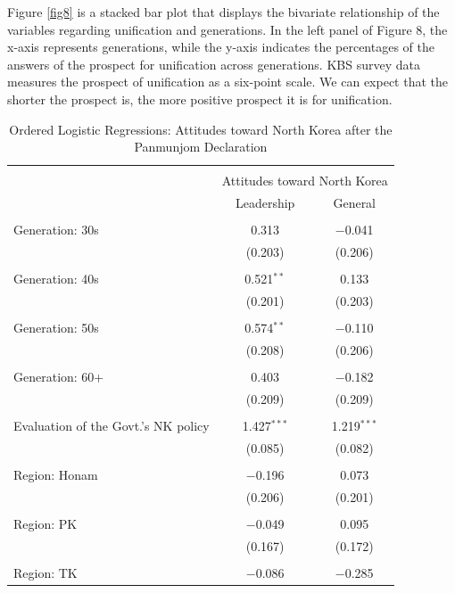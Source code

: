 \documentclass[letterpaper,9pt,twocolumn,twoside,]{pinp}
\begin{document}
Figure \ref{fig8} is a stacked bar plot that displays the bivariate
relationship of the variables regarding unification and generations. In
the left panel of Figure 8, the x-axis represents generations, while the
y-axis indicates the percentages of the answers of the prospect for
unification across generations. KBS survey data measures the prospect of
unification as a six-point scale. We can expect that the shorter the
prospect is, the more positive prospect it is for unification.

\begin{table}[H] \centering 
  \caption{Ordered Logistic Regressions: Attitudes toward North Korea after the Panmunjom Declaration} 
  \label{tab1} 
\begin{tabular}{@{\extracolsep{5pt}}lcc} 
\\[-1.8ex]\hline 
\hline \\[-1.8ex] 
 & \multicolumn{2}{c}{Attitudes toward North Korea} \\ 
\cline{2-3} 
 & Leadership & General \\ 
\hline \\[-1.8ex] 
 Generation: 30s & 0.313 & $-$0.041 \\ 
  & (0.203) & (0.206) \\ 
  & & \\ 
 Generation: 40s & 0.521$^{**}$ & 0.133 \\ 
  & (0.201) & (0.203) \\ 
  & & \\ 
 Generation: 50s & 0.574$^{**}$ & $-$0.110 \\ 
  & (0.208) & (0.206) \\ 
  & & \\ 
 Generation: 60+ & 0.403 & $-$0.182 \\ 
  & (0.209) & (0.209) \\ 
  & & \\ 
 Evaluation of the Govt.'s NK policy & 1.427$^{***}$ & 1.219$^{***}$ \\ 
  & (0.085) & (0.082) \\ 
  & & \\ 
 Region: Honam & $-$0.196 & 0.073 \\ 
  & (0.206) & (0.201) \\ 
  & & \\ 
 Region: PK & $-$0.049 & 0.095 \\ 
  & (0.167) & (0.172) \\ 
  & & \\ 
 Region: TK & $-$0.086 & $-$0.285 \\ 

\end{tabular}
\end{table}
\end{document}
